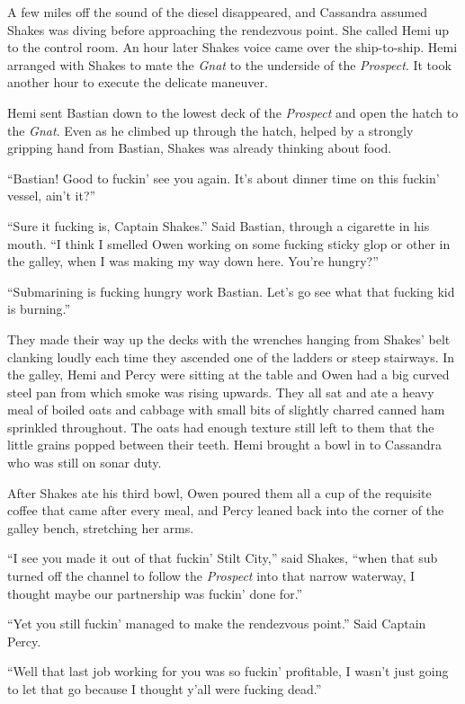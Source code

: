 \documentclass[
]{scrbook}
\begin{document}
A few miles off the sound of the diesel disappeared, and Cassandra
assumed Shakes was diving before approaching the rendezvous point. She
called Hemi up to the control room. An hour later Shakes voice came over
the ship-to-ship. Hemi arranged with Shakes to mate the \emph{Gnat} to
the underside of the \emph{Prospect}. It took another hour to execute
the delicate maneuver.

Hemi sent Bastian down to the lowest deck of the \emph{Prospect} and
open the hatch to the \emph{Gnat}. Even as he climbed up through the
hatch, helped by a strongly gripping hand from Bastian, Shakes was
already thinking about food.

``Bastian! Good to fuckin' see you again. It's about dinner time on this
fuckin' vessel, ain't it?''

``Sure it fucking is, Captain Shakes.'' Said Bastian, through a
cigarette in his mouth. ``I think I smelled Owen working on some fucking
sticky glop or other in the galley, when I was making my way down here.
You're hungry?''

``Submarining is fucking hungry work Bastian. Let's go see what that
fucking kid is burning.''

They made their way up the decks with the wrenches hanging from Shakes'
belt clanking loudly each time they ascended one of the ladders or steep
stairways. In the galley, Hemi and Percy were sitting at the table and
Owen had a big curved steel pan from which smoke was rising upwards.
They all sat and ate a heavy meal of boiled oats and cabbage with small
bits of slightly charred canned ham sprinkled throughout. The oats had
enough texture still left to them that the little grains popped between
their teeth. Hemi brought a bowl in to Cassandra who was still on sonar
duty.

After Shakes ate his third bowl, Owen poured them all a cup of the
requisite coffee that came after every meal, and Percy leaned back into
the corner of the galley bench, stretching her arms.

``I see you made it out of that fuckin' Stilt City,'' said Shakes,
``when that sub turned off the channel to follow the \emph{Prospect}
into that narrow waterway, I thought maybe our partnership was fuckin'
done for.''

``Yet you still fuckin' managed to make the rendezvous point.'' Said
Captain Percy.

``Well that last job working for you was so fuckin' profitable, I wasn't
just going to let that go because I thought y'all were fucking dead.''
\end{document}
